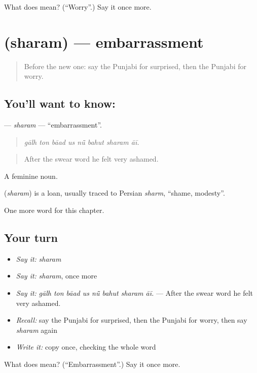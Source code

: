 \begin{tcolorbox}[breakable,colback=teal!4,colframe=teal!35!black,title={Before you move on}]
What does  mean? (\textquotedblleft{}Worry\textquotedblright{}.) Say it once more.
\end{tcolorbox}
\section[\texorpdfstring{\pa{ਸ਼ਰਮ} (sharam)}{ਸ਼ਰਮ (sharam)}]{ (sharam) — embarrassment}

\label{lesson:PA-C326-sharam}



\begin{quote}
Before the new one: say the Punjabi for surprised, then the Punjabi for worry.
\end{quote}

\subsection*{You'll want to know: }
\textbf{} — \emph{sharam} — \textquotedblleft{}embarrassment\textquotedblright{}.

\begin{quote}
       
\end{quote}

\begin{quote}
\emph{gālh ton bāad us nū̃ bahut sharam āī.}
\end{quote}

\begin{quote}
After the swear word he felt very ashamed.
\end{quote}

A feminine noun.

\begin{cousinweb}
\textbf{} (\emph{sharam}) is a loan, usually traced to Persian \emph{sharm}, \textquotedblleft{}shame, modesty\textquotedblright{}.
\end{cousinweb}

\begin{grammarlens}[title={What you've built}]
One more word for this chapter.
\end{grammarlens}

\subsection*{Your turn}
\begin{itemize}
\raggedright
  \item \emph{Say it:} \emph{sharam}
  \item \emph{Say it:} \emph{sharam}, once more
  \item \emph{Say it:} \emph{gālh ton bāad us nū̃ bahut sharam āī.} — After the swear word he felt very ashamed.
  \item \emph{Recall:} say the Punjabi for surprised, then the Punjabi for worry, then say \emph{sharam} again
  \item \emph{Write it:} copy \textbf{} once, checking the whole word
\end{itemize}

\begin{tcolorbox}[breakable,colback=teal!4,colframe=teal!35!black,title={Before you move on}]
What does  mean? (\textquotedblleft{}Embarrassment\textquotedblright{}.) Say it once more.
\end{tcolorbox}
